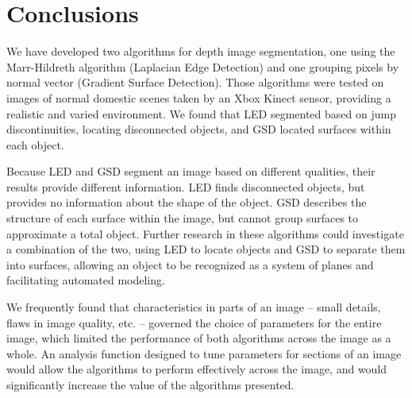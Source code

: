 
\section{Conclusions}
\label{sec:concl}

We have developed two algorithms for depth image segmentation, one using the Marr-Hildreth algorithm (Laplacian Edge Detection) and one grouping pixels by normal vector (Gradient Surface Detection).  Those algorithms were tested on images of normal domestic scenes taken by an Xbox Kinect sensor, providing a realistic and varied environment.  We found that LED segmented based on jump discontinuities, locating disconnected objects, and GSD located surfaces within each object.

Because LED and GSD segment an image based on different qualities, their results provide different information.  LED finds disconnected objects, but provides no information about the shape of the object.  GSD describes the structure of each surface within the image, but cannot group surfaces to approximate a total object.  Further research in these algorithms could investigate a combination of the two, using LED to locate objects and GSD to separate them into surfaces, allowing an object to be recognized as a system of planes and facilitating automated modeling.  

We frequently found that characteristics in parts of an image -- small details, flaws in image quality, etc. -- governed the choice of parameters for the entire image, which limited the performance of both algorithms across the image as a whole.  An analysis function designed to tune parameters for sections of an image would allow the algorithms to perform effectively across the image, and would significantly increase the value of the algorithms presented.